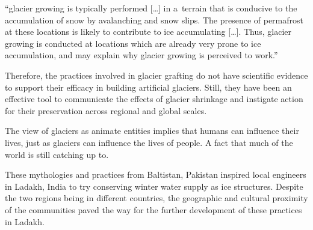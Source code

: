 \begin{thesis_quotation}

“glacier growing is typically performed […] in a terrain that is conducive to the accumulation of snow by
avalanching and snow slips. The presence of permafrost at these locations is likely to contribute to ice
accumulating […]. Thus, glacier growing is conducted at locations which are already very prone to ice
accumulation, and may explain why glacier growing is perceived to work.” 

\end{thesis_quotation}

Therefore, the practices involved in glacier grafting do not have scientific evidence to support their efficacy
in building artificial glaciers. Still, they have been an effective tool to communicate the effects of
glacier shrinkage and instigate action for their preservation across regional and global scales. 

The view of glaciers as animate entities implies that humans can influence their lives, just as glaciers can
influence the lives of people. A fact that much of the world is still catching up to.

These mythologies and practices from Baltistan, Pakistan inspired local engineers in Ladakh, India to
try conserving winter water supply as ice structures. Despite the two regions being in different countries, the
geographic and cultural proximity of the communities paved the way for the further development of these practices in
Ladakh.
